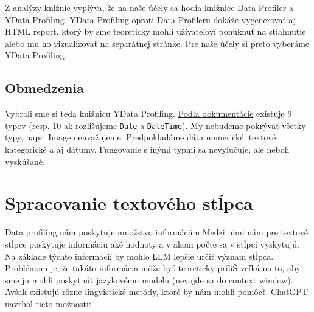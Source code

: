 Z analýzy knižníc vyplýva, že na naše účely sa hodia knižnice Data Profiler a YData Profiling. YData Profiling oproti Data Profileru dokáže vygenerovať aj HTML report, ktorý by sme teoreticky mohli užívateľovi ponúknuť na stiahnutie alebo mu ho vizualizovať na separátnej stránke. Pre naše účely si preto vyberáme YData Profiling.

\subsection{Obmedzenia}

Vybrali sme si teda knižnicu YData Profiling. \href{https://docs.profiling.ydata.ai/latest/getting-started/concepts/#data-types}{Podľa dokumentácie} existuje 9 typov (resp. 10 ak rozlišujeme \verb|Date| a \verb|DateTime|). My nebudeme pokrývať všetky typy, napr. Image neuvažujeme. Predpokladáme dáta numerické, textové, kategorické a aj dátumy. Fungovanie s inými typmi sa nevylučuje, ale neboli vyskúšané.

\section{Spracovanie textového stĺpca}

Data profiling nám poskytuje množstvo informáciím Medzi nimi nám pre textové stĺpce poskytuje informáciu aké hodnoty a v akom počte sa v stĺpci vyskytujú. Na základe týchto informácií by mohlo LLM lepšie určiť význam stĺpca. Problémom je, že takáto informácia môže byť teoreticky príliŠ veľká na to, aby sme ju mohli poskytnúť jazykovému modelu (nevojde sa do context window). Avšak existujú rôzne lingvistické metódy, ktoré by nám mohli pomôcť. ChatGPT navrhol tieto možnosti:

